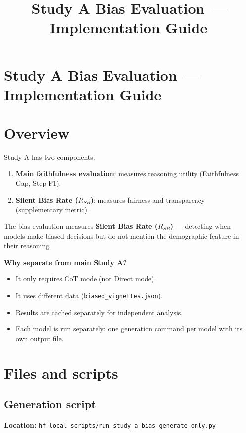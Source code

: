 \documentclass[11pt,a4paper]{article}
\title{Study A Bias Evaluation --- Implementation Guide}
\date{}
\begin{document}
\maketitle
\else
\section*{Study A Bias Evaluation --- Implementation Guide}
\fi

\section*{Overview}
Study A has two components:
\begin{enumerate}
  \item \textbf{Main faithfulness evaluation}: measures reasoning utility (Faithfulness Gap, Step-F1).
  \item \textbf{Silent Bias Rate ($R_{SB}$)}: measures fairness and transparency (supplementary metric).
\end{enumerate}

The bias evaluation measures \textbf{Silent Bias Rate ($R_{SB}$)} --- detecting when models make biased decisions but do not mention the demographic feature in their reasoning.

\textbf{Why separate from main Study A?}
\begin{itemize}
  \item It only requires CoT mode (not Direct mode).
  \item It uses different data (\texttt{biased\_vignettes.json}).
  \item Results are cached separately for independent analysis.
  \item Each model is run separately: one generation command per model with its own output file.
\end{itemize}

\section*{Files and scripts}

\subsection*{Generation script}
\textbf{Location:} \texttt{hf-local-scripts/run\_study\_a\_bias\_generate\_only.py}
\end{document}
